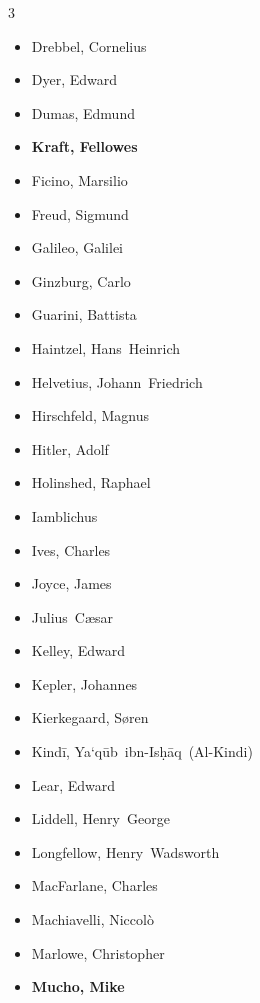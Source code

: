 \documentclass[10pt,makeidx]{extreport}
\begin{document}
\begin{multicols}{3}
\begin{itemize}
  \item Drebbel, Cornelius
  \item Dyer, Edward
  \item Dumas, Edmund
  \item \textbf{Kraft, Fellowes}
  \item Ficino, Marsilio
  \item Freud, Sigmund
  \item Galileo, Galilei
  \item Ginzburg, Carlo
  \item Guarini, Battista
  \item Haintzel, Hans~Heinrich
  \item Helvetius, Johann~Friedrich
  \item Hirschfeld, Magnus
  \item Hitler, Adolf
  \item Holinshed, Raphael
  \item Iamblichus
  \item Ives, Charles
  \item Joyce, James
  \item Julius~Cæsar
  \item Kelley, Edward
  \item Kepler, Johannes
  \item Kierkegaard, Søren
  \item Kindī, Ya‘qūb~ibn-Isḥāq~(Al-Kindi)
  \item Lear, Edward
  \item Liddell, Henry~George
  \item Longfellow, Henry~Wadsworth
  \item MacFarlane, Charles
  \item Machiavelli, Niccolò
  \item Marlowe, Christopher
  \item \textbf{Mucho, Mike}

\end{itemize}
\end{multicols}
\end{document}
